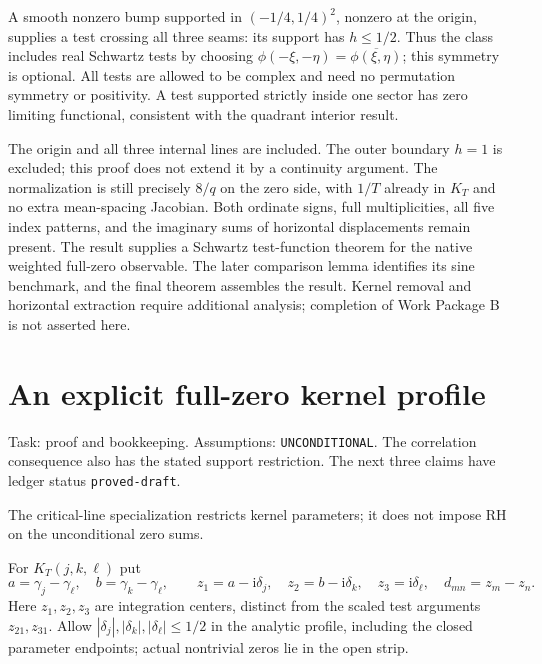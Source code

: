 \documentclass[11pt]{article}
\newcommand{\ii}{\mathrm i}
\begin{document}
A smooth nonzero bump supported in \((-1/4,1/4)^2\), nonzero at
the origin, supplies a test crossing all three seams: its support has
\(h\leq1/2\). Thus the class includes real Schwartz tests by choosing
\(\phi(-\xi,-\eta)=\overline{\phi(\xi,\eta)}\); this symmetry is
optional. All tests are allowed to be complex and need no permutation
symmetry or positivity. A test supported strictly inside one sector has
zero limiting functional, consistent with the quadrant interior result.

The origin and all three internal lines are included. The outer boundary
\(h=1\) is excluded; this proof does not extend it by a continuity
argument. The normalization is still precisely \(8/q\) on the zero side,
with \(1/T\) already in \(K_T\) and no extra mean-spacing Jacobian.
Both ordinate signs, full multiplicities, all five index patterns, and
the imaginary sums of horizontal displacements remain present. The
result supplies a Schwartz test-function theorem for the native weighted
full-zero observable. The later comparison lemma identifies its sine
benchmark, and the final theorem assembles the result. Kernel removal and
horizontal extraction require additional analysis; completion of Work
Package B is not asserted here.
\section{An explicit full-zero kernel profile}

Task: proof and bookkeeping. Assumptions: \texttt{UNCONDITIONAL}.
The correlation consequence also has the stated support restriction.
The next three claims have ledger status \texttt{proved-draft}.

The critical-line specialization restricts kernel parameters; it does not impose RH
on the unconditional zero sums.

For \(K_T(j,k,\ell)\) put
\[
 a=\gamma_j-\gamma_\ell,\quad b=\gamma_k-\gamma_\ell,\qquad
 z_1=a-\ii\delta_j,\quad z_2=b-\ii\delta_k,\quad z_3=\ii\delta_\ell,
 \quad d_{mn}=z_m-z_n.
\]
Here \(z_1,z_2,z_3\) are integration centers, distinct from the scaled
test arguments \(z_{21},z_{31}\). Allow \(|\delta_j|,|\delta_k|,
|\delta_\ell|\leq1/2\) in the analytic profile, including the closed
parameter endpoints; actual nontrivial zeros lie in the open strip.
\end{document}
